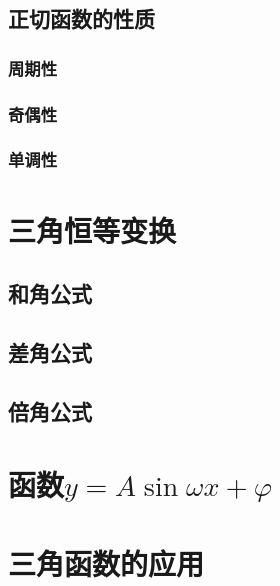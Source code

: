 \subsection{正切函数的性质}
\subsubsection{周期性}
\subsubsection{奇偶性}
\subsubsection{单调性}

\section{三角恒等变换}
\subsection{和角公式}
\subsection{差角公式}
\subsection{倍角公式}

\section{函数$y=A\sin{\omega x + \varphi}$}


\section{三角函数的应用}

